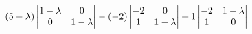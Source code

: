 \documentclass[preview]{standalone}
\begin{document}
\begin{align*}
\special{dvisvgm:raw <g id='unique000'>}(5-\lambda)\begin{vmatrix} 1-\lambda & 0 \\ 0 & 1-\lambda \end{vmatrix} - (-2)\begin{vmatrix} -2 & 0 \\ 1 & 1-\lambda \end{vmatrix} + 1\begin{vmatrix} -2 & 1-\lambda \\ 1 & 0 \end{vmatrix}\special{dvisvgm:raw </g>}
\end{align*}
\end{document}
